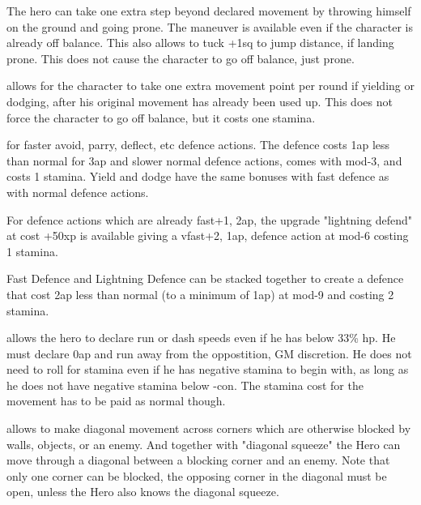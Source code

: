 

The hero can take one extra step beyond declared movement by throwing himself on the ground and going prone. The maneuver is available even if the character is already off balance. This also allows to tuck +1sq to jump distance, if landing prone. This does not cause the character to go off balance, just prone.


 allows for the character to take one extra movement point per round if yielding or dodging, after his original movement has already been used up. This does not force the character to go off balance, but it costs one stamina.


 for faster avoid, parry, deflect, etc defence actions. The defence costs 1ap less than normal for 3ap and slower normal defence actions, comes with mod-3, and costs 1 stamina. Yield and dodge have the same bonuses with fast defence as with normal defence actions.

For defence actions which are already fast+1, 2ap, the upgrade "lightning defend" at cost +50xp is available giving a vfast+2, 1ap, defence action at mod-6 costing 1 stamina.

Fast Defence and Lightning Defence can be stacked together to create a defence that cost 2ap less than normal (to a minimum of 1ap) at mod-9 and costing 2 stamina.


 allows the hero to declare run or dash speeds even if he has below 33\% hp. He must declare 0ap and run away from the oppostition, GM discretion. He does not need to roll for stamina even if he has negative stamina to begin with, as long as he does not have negative stamina below -con. The stamina cost for the movement has to be paid as normal though.


 allows to make diagonal movement across corners which are otherwise blocked by walls, objects, or an enemy. And together with "diagonal squeeze" the Hero can move through a diagonal between a blocking corner and an enemy. Note that only one corner can be blocked, the opposing corner in the diagonal must be open, unless the Hero also knows the diagonal squeeze.


